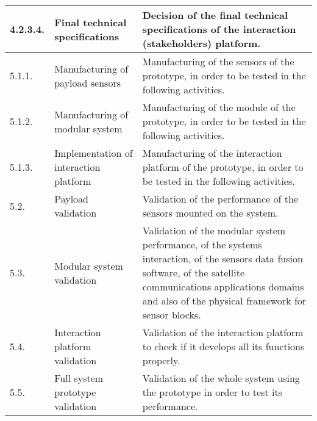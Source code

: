 \begin{longtable}[H]{l >{\raggedright\arraybackslash}p{4cm} p{8cm}}
	\midrule
	
	4.2.3.4. & Final technical specifications & Decision of the final technical specifications of the interaction (stakeholders) platform.\vspace{0.2cm} \\

	
	\midrule

	5.1.1. & Manufacturing of payload sensors & Manufacturing of the sensors of the prototype, in order to be tested in the following activities.\vspace{0.2cm} \\
	
	\midrule
	
	5.1.2. & Manufacturing of modular system & Manufacturing of the module of the prototype, in order to be tested in the following activities.\vspace{0.2cm} \\
	
	\midrule
	
	5.1.3. & Implementation of interaction platform & Manufacturing of the interaction platform of the prototype, in order to be tested in the following activities.\vspace{0.2cm} \\
	
	\midrule
	
	5.2. & Payload validation & Validation of the performance of the sensors mounted on the system.\vspace{0.2cm} \\
	
	\midrule
	
	5.3. & Modular system validation & Validation of the modular system performance, of the systems interaction, of the sensors data fusion software, of the satellite communications applications domains and also of the physical framework for sensor blocks.\vspace{0.2cm} \\
	
	\midrule
	
	5.4. & Interaction platform validation & Validation of the interaction platform to check if it develops all its functions properly.\vspace{0.2cm} \\
	
	\midrule
	
	5.5. & Full system prototype validation & Validation of the whole system using the prototype in order to test its performance.\vspace{0.2cm} \\
	

\end{longtable}
